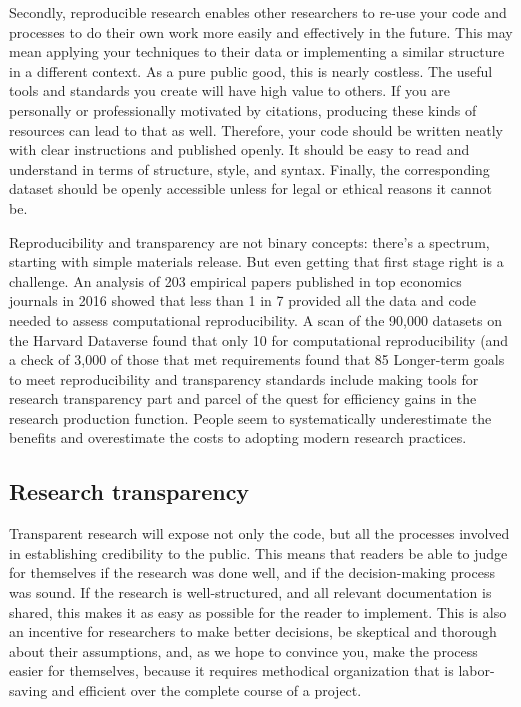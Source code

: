 Secondly, reproducible research
enables other researchers to re-use your code and processes
to do their own work more easily and effectively in the future.
This may mean applying your techniques to their data
or implementing a similar structure in a different context.
As a pure public good, this is nearly costless.
The useful tools and standards you create will have high value to others.
If you are personally or professionally motivated by citations,
producing these kinds of resources can lead to that as well.
Therefore, your code should be written neatly with clear instructions and published openly.
It should be easy to read and understand in terms of structure, style, and syntax.
Finally, the corresponding dataset should be openly accessible
unless for legal or ethical reasons it cannot be.

Reproducibility and transparency are not binary concepts:
there’s a spectrum, starting with simple materials release.
But even getting that first stage right is a challenge.
An analysis of 203 empirical papers published in top economics journals in 2016
showed that less than 1 in 7 provided all the data and code
needed to assess computational reproducibility.\cite{galiani2017incentives}
A scan of the 90,000 datasets on the Harvard Dataverse
found that only 10%
for computational reproducibility
(and a check of 3,000 of those that met requirements
found that 85%
Longer-term goals to meet reproducibility and transparency standards
include making tools for research transparency part and parcel
of the quest for efficiency gains in the research production function.
People seem to systematically underestimate the benefits
and overestimate the costs to adopting modern research practices.

\subsection{Research transparency}

Transparent research will expose not only the code,
but all the processes involved in establishing credibility to the public.
This means that readers be able to judge for themselves if the research was done well,
and if the decision-making process was sound.
If the research is well-structured, and all relevant documentation is shared,
this makes it as easy as possible for the reader to implement.
This is also an incentive for researchers to make better decisions,
be skeptical and thorough about their assumptions,
and, as we hope to convince you, make the process easier for themselves,
because it requires methodical organization that is labor-saving and efficient over the complete course of a project.

